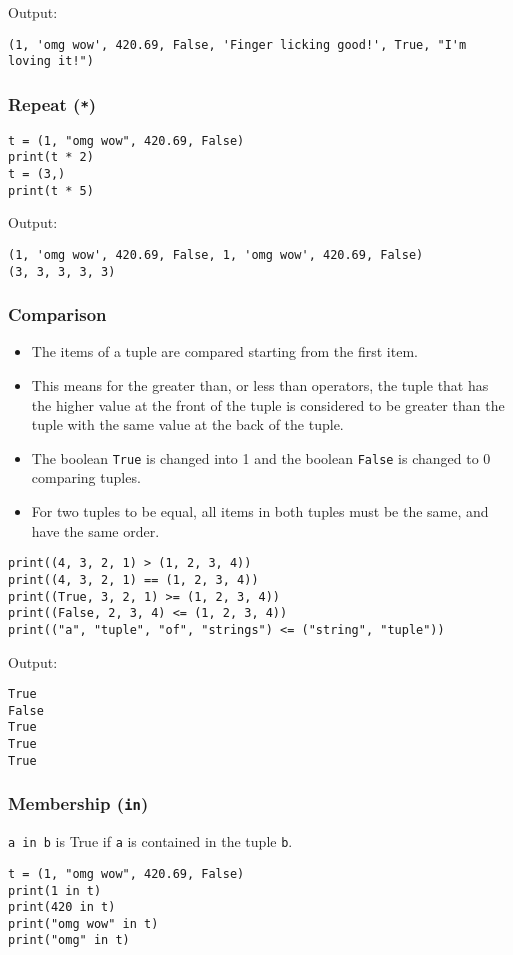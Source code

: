\documentclass[11pt]{article}
\begin{document}
 \noindent Output:

\label{orgd83b524}
\begin{verbatim}
(1, 'omg wow', 420.69, False, 'Finger licking good!', True, "I'm loving it!")
\end{verbatim}
\subsubsection{Repeat (\texttt{*})}
\label{sec:orgb2baffe}
\begin{verbatim}
t = (1, "omg wow", 420.69, False)
print(t * 2)
t = (3,)
print(t * 5)
\end{verbatim}

 \noindent Output:

\label{orgc512bcf}
\begin{verbatim}
(1, 'omg wow', 420.69, False, 1, 'omg wow', 420.69, False)
(3, 3, 3, 3, 3)
\end{verbatim}
\subsubsection{Comparison}
\label{sec:org3ac75b9}
\begin{itemize}
\item The items of a tuple are compared starting from the first item.
\item This means for the greater than, or less than operators, the tuple that has the higher value at the front of the tuple is considered to be greater than the tuple with the same value at the back of the tuple.
\item The boolean \texttt{True} is changed into 1 and the boolean \texttt{False} is changed to 0 comparing tuples.
\item For two tuples to be equal, all items in both tuples must be the same, and have the same order.
\end{itemize}
\begin{verbatim}
print((4, 3, 2, 1) > (1, 2, 3, 4))
print((4, 3, 2, 1) == (1, 2, 3, 4))
print((True, 3, 2, 1) >= (1, 2, 3, 4))
print((False, 2, 3, 4) <= (1, 2, 3, 4))
print(("a", "tuple", "of", "strings") <= ("string", "tuple"))
\end{verbatim}

 \noindent Output:

\label{org028e2ae}
\begin{verbatim}
True
False
True
True
True
\end{verbatim}
\subsubsection{Membership (\texttt{in})}
\label{sec:orgc46059d}
\texttt{a in b} is True if \texttt{a} is contained in the tuple \texttt{b}.
\begin{verbatim}
t = (1, "omg wow", 420.69, False)
print(1 in t)
print(420 in t)
print("omg wow" in t)
print("omg" in t)
\end{verbatim}
\end{document}
